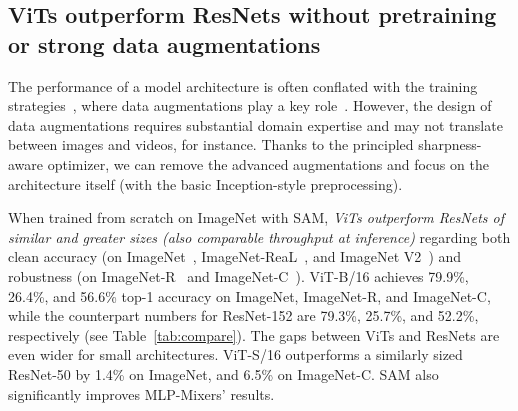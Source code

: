 \documentclass{article}
\begin{document}
\subsection{ViTs outperform ResNets without pretraining or strong data augmentations}
\label{sec:outperform}
The performance of a model architecture is often conflated with the training strategies~\cite{bello2021revisiting}, where data augmentations play a key role~\cite{cubuk2019autoaugment,cubuk2019randaugment,zhang2018mixup,xie2020advprop,chen2021robust}. However, the design of data augmentations requires substantial domain expertise and may not translate between images and videos, for instance.
Thanks to the principled sharpness-aware optimizer, we can remove the advanced augmentations  and focus on the architecture itself (with the basic Inception-style preprocessing).

When trained from scratch on ImageNet with SAM, \textit{ViTs outperform ResNets of similar and greater  sizes (also comparable throughput at inference)} regarding both clean accuracy (on ImageNet~\cite{deng2009imagenet}, ImageNet-ReaL~\cite{imagenet-real}, and ImageNet V2~\cite{imagenet-v2}) and robustness (on ImageNet-R~\cite{hendrycks2020faces} and ImageNet-C~\cite{hendrycks2019benchmarking}). 
ViT-B/16 achieves 79.9\%, 26.4\%, and 56.6\% top-1 accuracy on ImageNet, ImageNet-R, and ImageNet-C,  while the counterpart numbers for ResNet-152 are 79.3\%, 25.7\%, and 52.2\%, respectively (see Table~\ref{tab:compare}).
The gaps between ViTs and ResNets are even wider for small architectures. ViT-S/16 outperforms a similarly sized ResNet-50 by 1.4\% on ImageNet, and 6.5\% on ImageNet-C. SAM also significantly improves MLP-Mixers' results. 
\end{document}
